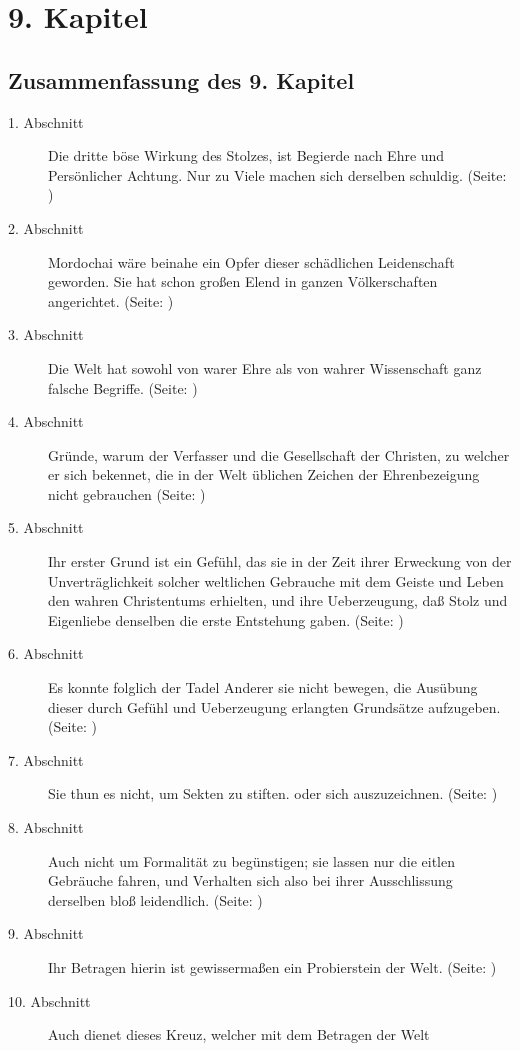 
\chapter{9. Kapitel} \label{kap9}


\section{Zusammenfassung des 9. Kapitel}
\footnotesize
\begin{description}
\item[1. Abschnitt] Die dritte böse Wirkung des Stolzes, ist Begierde nach Ehre
und Persönlicher Achtung. Nur zu Viele machen sich derselben schuldig. (Seite: \pageref{kap9_ab1})
\item[2. Abschnitt] Mordochai wäre beinahe ein Opfer dieser schädlichen
Leidenschaft geworden. Sie hat schon großen Elend in ganzen Völkerschaften
angerichtet. (Seite: \pageref{kap9_ab2})
\item[3. Abschnitt] Die Welt hat sowohl von warer Ehre als von wahrer
Wissenschaft ganz falsche Begriffe. (Seite: \pageref{kap9_ab3})
\item[4. Abschnitt] Gründe, warum der Verfasser und die Gesellschaft der
Christen, zu welcher er sich bekennet, die in der Welt üblichen Zeichen der
Ehrenbezeigung nicht gebrauchen (Seite: \pageref{kap9_ab4})
\item[5. Abschnitt] Ihr erster Grund ist ein Gefühl, das sie in der Zeit ihrer
Erweckung von der Unverträglichkeit solcher weltlichen Gebrauche mit dem Geiste
und Leben den wahren Christentums erhielten, und ihre Ueberzeugung, daß Stolz
und Eigenliebe denselben die erste Entstehung gaben. (Seite: \pageref{kap9_ab5})
\item[6. Abschnitt] Es konnte folglich der Tadel Anderer sie nicht bewegen, die
Ausübung dieser durch Gefühl und Ueberzeugung erlangten Grundsätze aufzugeben. (Seite: \pageref{kap9_ab6})
\item[7. Abschnitt] Sie thun es nicht, um Sekten zu stiften. oder sich
auszuzeichnen. (Seite: \pageref{kap9_ab7})
\item[8. Abschnitt] Auch nicht um Formalität zu begünstigen; sie lassen nur die
eitlen Gebräuche fahren, und Verhalten sich also bei ihrer Ausschlissung
derselben bloß leidendlich. (Seite: \pageref{kap9_ab8})
\item[9. Abschnitt] Ihr Betragen hierin ist gewissermaßen ein Probierstein der
Welt. (Seite: \pageref{kap9_ab9})
\item[10. Abschnitt] Auch dienet dieses Kreuz, welcher mit dem Betragen der Welt

\end{description}
